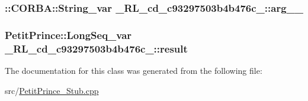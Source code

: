 \subsubsection[{\texorpdfstring{arg\+\_\+0\+\_\+}{arg_0_}}]{\setlength{\rightskip}{0pt plus 5cm}\+::C\+O\+R\+B\+A\+::\+String\+\_\+var \+\_\+R\+L\+\_\+cd\+\_\+c93297503b4b476c\+\_\+::arg\+\_\+\_\+}\hypertarget{class__0_r_l__cd__c93297503b4b476c__71000000_a6c99db7522f081f5f960329aa52f2939}{}\label{class__0_r_l__cd__c93297503b4b476c__71000000_a6c99db7522f081f5f960329aa52f2939}
\subsubsection[{\texorpdfstring{result}{result}}]{\setlength{\rightskip}{0pt plus 5cm}Petit\+Prince\+::\+Long\+Seq\+\_\+var \+\_\+R\+L\+\_\+cd\+\_\+c93297503b4b476c\+\_\+::result}\hypertarget{class__0_r_l__cd__c93297503b4b476c__71000000_af3a56f469452c58aa0b15ff954198b07}{}\label{class__0_r_l__cd__c93297503b4b476c__71000000_af3a56f469452c58aa0b15ff954198b07}


The documentation for this class was generated from the following file\+:\begin{DoxyCompactItemize}
\item 
src/\hyperlink{_petit_prince___stub_8cpp}{Petit\+Prince\+\_\+\+Stub.\+cpp}\end{DoxyCompactItemize}
